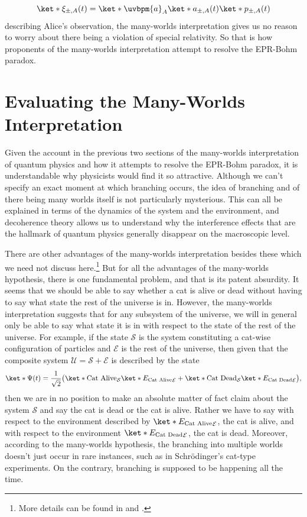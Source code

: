 \documentclass[12pt]{report}
\begin{document}
$$\ket*{\xi_{\pm,A}(t)}=\ket*{\uvbpm{a}}_A\ket*{a_{\pm,A}(t)}\ket*{p_{\pm, A}(t)}$$
describing Alice's observation, the many-worlds interpretation gives us no reason to worry about there being a violation of special relativity. So that is how proponents of the many-worlds interpretation attempt to resolve the EPR-Bohm paradox.





 
    
    \section{Evaluating the Many-Worlds Interpretation}\label{manyworldsinterpretation2}
    Given the account in the previous two sections of the many-worlds interpretation of quantum physics and how it attempts to resolve the EPR-Bohm paradox, it is understandable why physicists would find it so attractive. Although we can't specify an exact moment at which branching occurs, the idea of branching and of there being many worlds itself is not particularly mysterious. This can all be explained in terms of the dynamics of the system and the environment, and decoherence theory allows us to understand why the interference effects that are the hallmark of quantum physics generally disappear on the macroscopic level. 
       
       There are other advantages  of the many-worlds interpretation besides these which we need not discuss here.\footnote{More details can be found in \cite{Schlosshauer} and \cite{joos2013decoherence}.} But for all the advantages of the many-worlds hypothesis, there is one fundamental problem, and that is its patent absurdity. It seems that we should be able to say whether a cat is alive or dead without having to say what state the rest of the universe is in. However, the many-worlds interpretation suggests that for any subsystem of the universe, we will in general only be able to say what state it is in with respect to the state of the rest of the universe. For example, if the state $\mathcal{S}$ is the system constituting a cat-wise configuration of particles and $\mathcal{E}$ is the rest of the universe, then given that the composite system $\mathcal{U}=\mathcal{S}+\mathcal{E}$ is described by the state $$\ket*{\Psi(t)}=\frac{1}{\sqrt{2}}\big(\ket*{\text{Cat Alive}}_\mathcal{S}\ket*{E_\text{Cat Alive}}_\mathcal{E}+\ket*{\text{Cat Dead}}_\mathcal{S}\ket*{E_\text{Cat Dead}}_\mathcal{E}\big),$$ then we are in no position to make an absolute matter of fact claim about the system $\mathcal{S}$ and say the cat is dead or the cat is alive. Rather we have to say with respect to the environment described by $\ket*{E_\text{Cat Alive}}_\mathcal{E}$, the cat is alive, and with respect to the environment $\ket*{E_\text{Cat Dead}}_\mathcal{E}$, the cat is dead. Moreover, according to the many-worlds hypothesis, the branching into multiple worlds doesn't just occur in rare instances, such as in Schr\"{o}dinger's cat-type experiments. On the contrary, branching is supposed to be happening all the time.  
       
\end{document}
